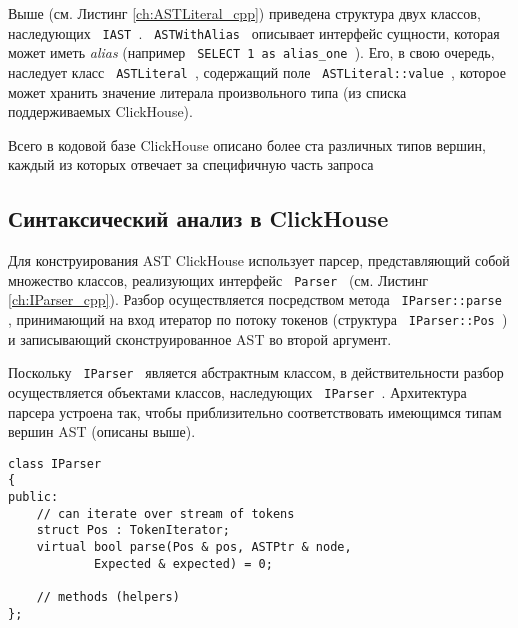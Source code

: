 Выше (см. Листинг \ref{ch:ASTLiteral_cpp}) приведена структура двух классов, наследующих \texttt{ IAST }. \texttt{ ASTWithAlias } описывает интерфейс сущности, которая может иметь \textit{alias} (например \texttt{ SELECT 1 as alias_one }). Его, в свою очередь, наследует класс \texttt{ ASTLiteral }, содержащий поле \texttt{ ASTLiteral::value }, которое может хранить значение литерала произвольного типа (из списка поддерживаемых ClickHouse).

Всего в кодовой базе ClickHouse описано более ста различных типов вершин, каждый из которых отвечает за специфичную часть запроса

\subsection{Синтаксический анализ в ClickHouse}
Для конструирования AST ClickHouse использует парсер, представляющий собой множество классов, реализующих интерфейс \texttt{ Parser } (см. Листинг \ref{ch:IParser_cpp}). Разбор осуществляется посредством метода \texttt{ IParser::parse }, принимающий на вход итератор по потоку токенов (структура \texttt{ IParser::Pos }) и записывающий сконструированное AST во второй аргумент.

Поскольку \texttt{ IParser } является абстрактным классом, в действительности разбор осуществляется объектами классов, наследующих \texttt{ IParser }. Архитектура парсера устроена так, чтобы приблизительно соответствовать имеющимся типам вершин AST (описаны выше).
\begin{code}
    \label{ch:IParser_cpp}
    \begin{verbatim}
class IParser
{
public:
    // can iterate over stream of tokens
    struct Pos : TokenIterator;
    virtual bool parse(Pos & pos, ASTPtr & node,
            Expected & expected) = 0;

    // methods (helpers)
};

    \end{verbatim}
\end{code}

